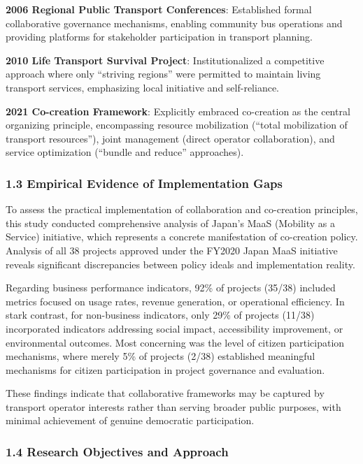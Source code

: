 \textbf{2006 Regional Public Transport Conferences}: Established formal collaborative governance mechanisms, enabling community bus operations and providing platforms for stakeholder participation in transport planning.

\textbf{2010 Life Transport Survival Project}: Institutionalized a competitive approach where only ``striving regions'' were permitted to maintain living transport services, emphasizing local initiative and self-reliance.

\textbf{2021 Co-creation Framework}: Explicitly embraced co-creation as the central organizing principle, encompassing resource mobilization (``total mobilization of transport resources''), joint management (direct operator collaboration), and service optimization (``bundle and reduce'' approaches).

\subsubsection{1.3 Empirical Evidence of Implementation Gaps}\label{empirical-evidence-of-implementation-gaps}

To assess the practical implementation of collaboration and co-creation principles, this study conducted comprehensive analysis of Japan's MaaS (Mobility as a Service) initiative, which represents a concrete manifestation of co-creation policy. Analysis of all 38 projects approved under the FY2020 Japan MaaS initiative reveals significant discrepancies between policy ideals and implementation reality.

Regarding business performance indicators, 92\% of projects (35/38) included metrics focused on usage rates, revenue generation, or operational efficiency. In stark contrast, for non-business indicators, only 29\% of projects (11/38) incorporated indicators addressing social impact, accessibility improvement, or environmental outcomes. Most concerning was the level of citizen participation mechanisms, where merely 5\% of projects (2/38) established meaningful mechanisms for citizen participation in project governance and evaluation.

These findings indicate that collaborative frameworks may be captured by transport operator interests rather than serving broader public purposes, with minimal achievement of genuine democratic participation.

\subsubsection{1.4 Research Objectives and Approach}\label{research-objectives-and-approach}

